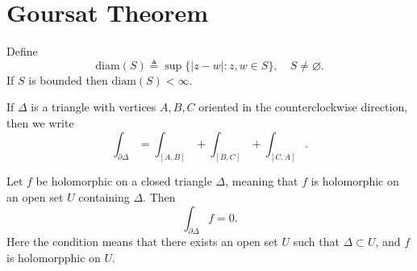 \section{Goursat Theorem}
\begin{defn}
Define
$$
\mathrm{diam}(S) \triangleq
\sup \{ |z - w| : z, w \in S \}, \quad
S \neq \varnothing.
$$
If $S$ is bounded then $\mathrm{diam}(S) < \infty$.
\end{defn}
\begin{defn}
If $\Delta$ is a triangle with vertices $A, B, C$
oriented in the counterclockwise direction, then we write
$$
\int_{\partial \Delta} = \int_{[A, B]} + \int_{[B, C]} + \int_{[C, A]}.
$$
\end{defn}

\begin{theorem}
Let $f$ be holomorphic on a closed triangle $\Delta$, meaning that
$f$ is holomorphic on an open set $U$ containing $\Delta$. Then
$$
\int_{\partial \Delta} f = 0.
$$
Here the condition means that there exists an open set
$U$ such that $\Delta \subset U$, and $f$ is holomorpphic on $U$.
\end{theorem}

